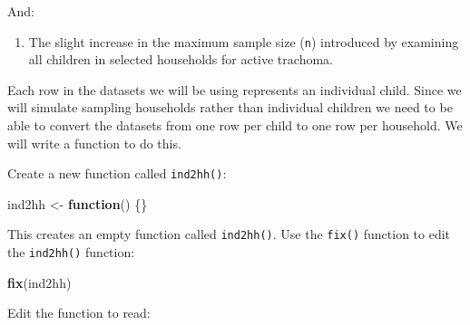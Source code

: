 \documentclass[12pt,a4paper]{book}
\newenvironment{Shaded}{\begin{snugshade}}{\end{snugshade}}
\newcommand{\ControlFlowTok}[1]{\textcolor[rgb]{0.13,0.29,0.53}{\textbf{#1}}}
\newcommand{\KeywordTok}[1]{\textcolor[rgb]{0.13,0.29,0.53}{\textbf{#1}}}
\newcommand{\NormalTok}[1]{#1}
\newcommand{\OperatorTok}[1]{\textcolor[rgb]{0.81,0.36,0.00}{\textbf{#1}}}
\newcommand{\OtherTok}[1]{\textcolor[rgb]{0.56,0.35,0.01}{#1}}
\newcommand{\StringTok}[1]{\textcolor[rgb]{0.31,0.60,0.02}{#1}}
\providecommand{\tightlist}{%
  \setlength{\itemsep}{0pt}\setlength{\parskip}{0pt}}
\theoremstyle{definition}
\theoremstyle{definition}
\theoremstyle{definition}
\theoremstyle{remark}
\begin{document}
And:

\begin{enumerate}
\def\labelenumi{\arabic{enumi}.}
\setcounter{enumi}{1}
\tightlist
\item
  The slight increase in the maximum sample size (\texttt{n}) introduced
  by examining all children in selected households for active trachoma.
\end{enumerate}

Each row in the datasets we will be using represents an individual
child. Since we will simulate sampling households rather than individual
children we need to be able to convert the datasets from one row per
child to one row per household. We will write a function to do this.

Create a new function called \texttt{ind2hh()}:

\begin{Shaded}
\begin{Highlighting}[]
\NormalTok{ind2hh <-}\StringTok{ }\ControlFlowTok{function}\NormalTok{() \{\}}
\end{Highlighting}
\end{Shaded}

This creates an empty function called \texttt{ind2hh()}. Use the
\texttt{fix()} function to edit the \texttt{ind2hh()} function:

\begin{Shaded}
\begin{Highlighting}[]
\KeywordTok{fix}\NormalTok{(ind2hh)}
\end{Highlighting}
\end{Shaded}

Edit the function to read:

\begin{Shaded}
\end{Shaded}
\end{document}
